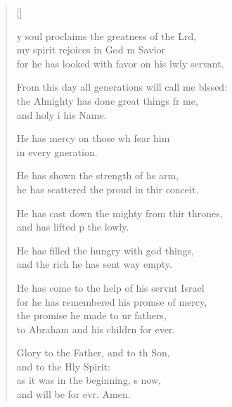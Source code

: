 \settowidth{\versewidth}{From this day all generations will call me blessed: +}
\begin{verse}[\versewidth]
  \begin{patverse}
y soul proclaims the greatness of the Lrd,\Flex\\
my spirit rejoices in God m Savior\Med\\
for he has looked with favor on his lwly servant.

From this day all generations will call me blssed:\Flex\\
the Almighty has done great things fr me,\Med\\
and holy i his Name.

He has mercy on those wh fear him\Med\\
in every gneration.

He has shown the strength of h\pointup{\i}s arm,\Med\\
he has scattered the proud in thir conceit.

He has cast down the mighty from thir thrones,\Med\\
and has lifted p the lowly.

He has filled the hungry with god things,\Med\\
and the rich he has sent way empty.

He has come to the help of his servnt Israel\Med\\
for he has remembered his promse of mercy,\\
the promise he made to ur fathers,\Med\\
to Abraham and his childrn for ever.

Glory to the Father, and to th Son,\Med\\
and to the Hly Spirit:\\
as it was in the beginning, \pointup{\i}s now,\Med\\
and will be for evr. Amen.
  \end{patverse}
\end{verse}
